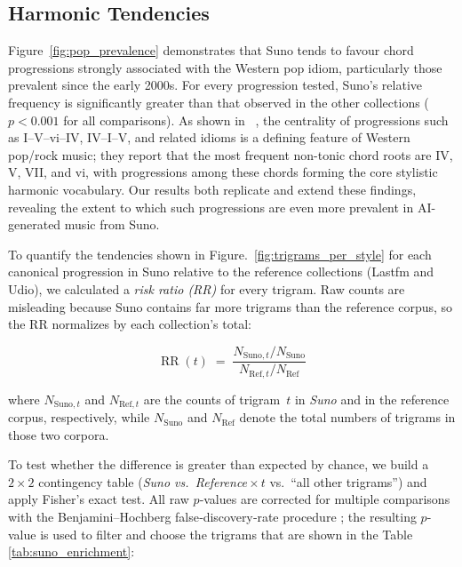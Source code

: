 \documentclass{article}
\begin{document}

\subsection{Harmonic Tendencies}
\label{sec:suno_tendencies}
Figure~\ref{fig:pop_prevalence} demonstrates that Suno tends to favour chord progressions strongly associated with the Western pop idiom, particularly those prevalent since the early 2000s. For every progression tested, Suno’s relative frequency is significantly greater than that observed in the other collections ($p < 0.001$ for all comparisons). As shown in ~\citep{temperley2013statistical}, the centrality of progressions such as I–V–vi–IV, IV–I–V, and related idioms is a defining feature of Western pop/rock music; they report that the most frequent non-tonic chord roots are IV, V, VII, and vi, with progressions among these chords forming the core stylistic harmonic vocabulary. Our results both replicate and extend these findings, revealing the extent to which such progressions are even more prevalent in AI-generated music from Suno.

To quantify the tendencies shown in Figure.~\ref{fig:trigrams_per_style} for each canonical progression in Suno relative to the reference collections (Lastfm and Udio), we calculated a \emph{risk ratio (RR)} for every trigram.  Raw counts are misleading because Suno contains far more trigrams than the reference corpus, so the RR normalizes by each collection’s total:

\[
\operatorname{RR}(t) \;=\;
\frac{N_{\mathrm{Suno},t}/N_{\mathrm{Suno}}}
     {N_{\mathrm{Ref},t}/N_{\mathrm{Ref}}}
\]

\noindent
where $N_{\mathrm{Suno},t}$ and $N_{\mathrm{Ref},t}$ are the counts of trigram~$t$ in \textit{Suno} and in the reference corpus, respectively, while $N_{\mathrm{Suno}}$ and $N_{\mathrm{Ref}}$ denote the total numbers of trigrams in those two corpora.

\smallskip
To test whether the difference is greater than expected by chance, we build a $2\times2$ contingency table (\emph{Suno vs.\ Reference}\,$\times$\,$t$ vs.\ ``all other trigrams'') and apply Fisher’s exact test. All raw $p$‑values are corrected for multiple comparisons with the Benjamini–Hochberg false‑discovery‑rate procedure \citep{benjamini1995controlling}; the resulting $p$-value is used to filter and choose the trigrams that are shown in the Table \ref{tab:suno_enrichment}:
\end{document}
